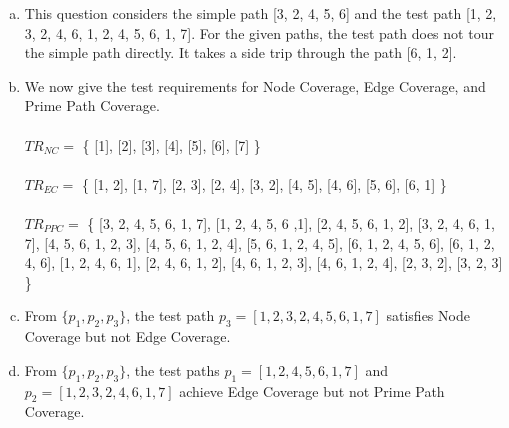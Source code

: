 \documentclass{article}
\begin{document}
\begin{enumerate}[(a)]
	\item This question considers the simple path [3, 2, 4, 5, 6] and the test path [1, 2, 3, 2, 4, 6, 1, 2, 4, 5, 6, 1, 7]. For the given paths, the test path does not tour the simple path directly. It takes a side trip through the path [6, 1, 2].
	\item We now give the test requirements for Node Coverage, Edge Coverage, and Prime Path Coverage. \\\\	
	$TR_{NC} =$ \{ [1], [2], [3], [4], [5], [6], [7] \} \\\\
	$ TR_{EC} =$ \{ [1, 2], [1, 7], [2, 3], [2, 4], [3, 2], [4, 5], [4, 6], [5, 6], [6, 1] \} \\\\
	$TR_{PPC} =$ \{ [3, 2, 4, 5, 6, 1, 7], 
					[1, 2, 4, 5, 6 ,1], 
					[2, 4, 5, 6, 1, 2], 
					[3, 2, 4, 6, 1, 7],
					[4, 5, 6, 1, 2, 3], 
					[4, 5, 6, 1, 2, 4], 
					[5, 6, 1, 2, 4, 5], 
					[6, 1, 2, 4, 5, 6], 
					[6, 1, 2, 4, 6], 
					[1, 2, 4, 6, 1], 
					[2, 4, 6, 1, 2],
					[4, 6, 1, 2, 3], 
					[4, 6, 1, 2, 4], 
					[2, 3, 2], 
					[3, 2, 3] \}

	\item From $ \{ p_1, p_2, p_3 \}$, the test path $p_3 = [1, 2, 3, 2, 4, 5, 6, 1, 7]$ satisfies Node Coverage but not Edge Coverage.
	\item From $ \{ p_1, p_2, p_3 \}$, the test paths 
	$p_1 = [1, 2, 4, 5, 6, 1, 7]$ and  $p_2 = [1, 2, 3, 2, 4, 6, 1, 7]$ achieve Edge Coverage but not Prime Path Coverage.
\end{enumerate}

\newpage
\end{document}
